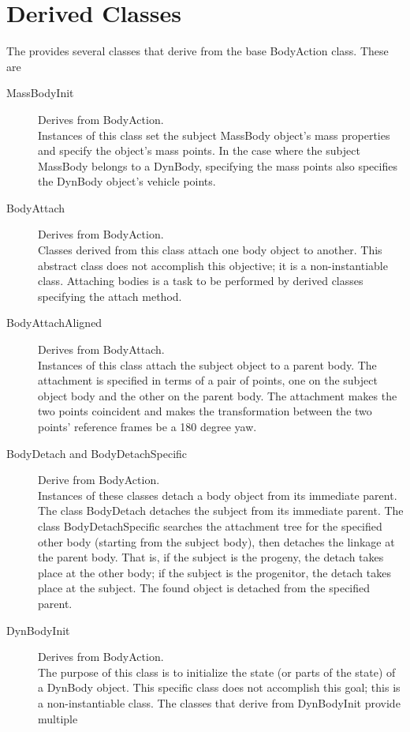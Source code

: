 \section*{\ModelDesc Derived Classes}

The \ModelDesc provides several classes that derive from the base BodyAction
class. These are
\begin{description}
\item[MassBodyInit] Derives from BodyAction. \\
Instances of this class set the subject MassBody object's
mass properties and specify the object's mass points.
In the case where the subject MassBody belongs to a DynBody,
specifying the mass points also specifies the DynBody object's
vehicle points.
\item[BodyAttach] Derives from BodyAction. \\
Classes derived from this class attach one body object to another.
This abstract class does not accomplish this objective;
it is a non-instantiable class. Attaching bodies is a task to be
performed by derived classes specifying the attach method.
\item[BodyAttachAligned] Derives from BodyAttach. \\
Instances of this class attach the subject object to a parent body.
The attachment is specified in terms of a pair of points, one on the subject
object body and the other on the parent body. The attachment makes the two
points coincident and makes the transformation between the two
points' reference frames be a 180 degree yaw.
\item[BodyDetach and BodyDetachSpecific] Derive from BodyAction. \\
Instances of these classes detach a body object
from its immediate parent.
The class BodyDetach detaches the subject from its
immediate parent. The class BodyDetachSpecific searches the attachment tree
for the specified other body (starting from the subject body), then detaches the
linkage at the parent body. That is, if the subject is the progeny, the detach
takes place at the other body; if the subject is the progenitor, the detach
takes place at the subject.
The found object is detached from the specified parent.
\item[DynBodyInit] Derives from BodyAction. \\
The purpose of this class is to initialize the state (or parts
of the state) of a DynBody object.
This specific class does not accomplish this goal;
this is a non-instantiable class.
The classes that derive from DynBodyInit provide multiple

\end{description}
